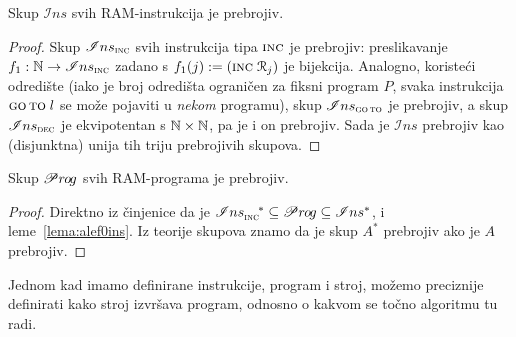 \begin{lema}[{name=[prebrojivost skupa $\mathscr Ins$]}]\label{lema:alef0ins}
Skup $\mathscr Ins$ svih RAM-instrukcija je prebrojiv.
\end{lema}
\begin{proof}
Skup $\mathscr Ins_{\textsc{inc}}$ svih instrukcija tipa $\textsc{inc}$ je prebrojiv: preslikavanje $f_1:{\mathbb N}\to\mathscr Ins_{\textsc{inc}}$ zadano s $f_1(j):=(\textsc{inc}\;\mathcal R_{j})$ je bijekcija. Analogno, koristeći odredište (iako je broj odredišta ograničen za fiksni program $P$, svaka instrukcija $\textsc{go\,to}\;l$ se može pojaviti u \emph{nekom} programu), skup $\mathscr Ins_{\textsc{go\,to}}$ je prebrojiv, a skup $\mathscr Ins_{\textsc{dec}}$ je ek\-vi\-po\-ten\-tan s ${\mathbb N}\times{\mathbb N}$, pa je i on prebrojiv. Sada je $\mathscr Ins$ prebrojiv kao (disjunktna) unija tih triju prebrojivih skupova.
\end{proof}

\begin{korolar}[{name=[prebrojivost skupa $\mathscr Pr\mspace{-1mu}oi\mspace{-2mu}g$]}]\label{kor:alef0prog}
	Skup $\mathscr Pr\mspace{-1mu}o\mspace{-2mu}g$ svih RAM-programa je prebrojiv.
\end{korolar}
\begin{proof}
	Direktno iz činjenice da je $\mathscr Ins_{\textsc{inc}}^{\quad*}\subseteq\mathscr Pr\mspace{-1mu}o\mspace{-2mu}g\subseteq\mathscr Ins^*$, i leme~\ref{lema:alef0ins}. Iz teorije skupova znamo da je skup $A^*$ prebrojiv ako je $A$ prebrojiv.
\end{proof}


Jednom kad imamo definirane instrukcije, program i stroj, možemo preciznije definirati kako stroj izvršava program, odnosno o kakvom se točno algoritmu tu radi.

